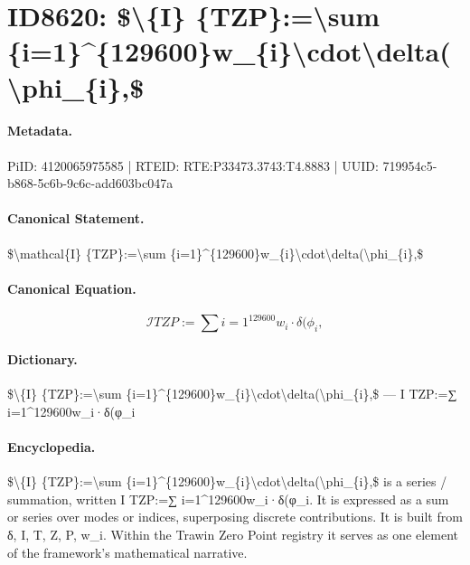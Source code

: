 \section*{ID8620: \$\textbackslash{}\{I\} \{TZP\}:=\textbackslash{}sum \{i=1\}\textasciicircum{}\{129600\}w\_\{i\}\textbackslash{}cdot\textbackslash{}delta(\textbackslash{}phi\_\{i\},\$}
\paragraph{Metadata.}
PiID: 4120065975585 | RTEID: RTE:P33473.3743:T4.8883 | UUID: 719954c5-b868-5c6b-9c6c-add603bc047a

\paragraph{Canonical Statement.}
\$\textbackslash{}mathcal\{I\} \{TZP\}:=\textbackslash{}sum \{i=1\}\textasciicircum{}\{129600\}w\_\{i\}\textbackslash{}cdot\textbackslash{}delta(\textbackslash{}phi\_\{i\},\$

\paragraph{Canonical Equation.}
\[
\mathcal{I} {TZP}:=\sum {i=1}^{129600}w_{i}\cdot\delta(\phi_{i},
\]

\paragraph{Dictionary.}
\$\textbackslash{}\{I\} \{TZP\}:=\textbackslash{}sum \{i=1\}\textasciicircum{}\{129600\}w\_\{i\}\textbackslash{}cdot\textbackslash{}delta(\textbackslash{}phi\_\{i\},\$ — I TZP:=∑ i=1\textasciicircum{}129600w\_i·δ(φ\_i

\paragraph{Encyclopedia.}
\$\textbackslash{}\{I\} \{TZP\}:=\textbackslash{}sum \{i=1\}\textasciicircum{}\{129600\}w\_\{i\}\textbackslash{}cdot\textbackslash{}delta(\textbackslash{}phi\_\{i\},\$ is a series / summation, written I TZP:=∑ i=1\textasciicircum{}129600w\_i·δ(φ\_i. It is expressed as a sum or series over modes or indices, superposing discrete contributions. It is built from δ, I, T, Z, P, w\_i. Within the Trawin Zero Point registry it serves as one element of the framework's mathematical narrative.
